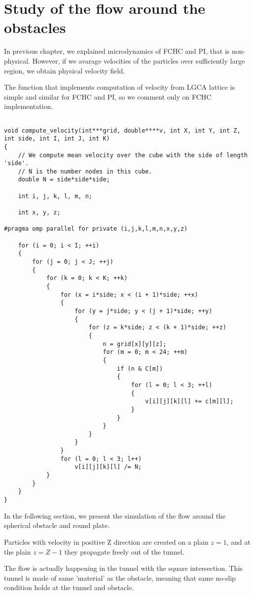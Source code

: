\chapter{Study of the flow around the obstacles}

In previous chapter, we explained microdynamics of FCHC and PI, that is non-physical.
However, if we avarage velocities of the particles over sufficiently large region, we obtain physical velocity field.

The function that implements computation of velocity from LGCA lattice is simple and similar for FCHC and PI, so we comment only on FCHC implementation.

\begin{lstlisting}

void compute_velocity(int***grid, double****v, int X, int Y, int Z, int side, int I, int J, int K)
{
	// We compute mean velocity over the cube with the side of length 'side'.
	// N is the number nodes in this cube.
	double N = side*side*side;

	int i, j, k, l, m, n;

	int x, y, z;

#pragma omp parallel for private (i,j,k,l,m,n,x,y,z)

	for (i = 0; i < I; ++i)
	{
		for (j = 0; j < J; ++j)
		{
			for (k = 0; k < K; ++k)
			{
				for (x = i*side; x < (i + 1)*side; ++x)
				{
					for (y = j*side; y < (j + 1)*side; ++y)
					{
						for (z = k*side; z < (k + 1)*side; ++z)
						{
							n = grid[x][y][z];
							for (m = 0; m < 24; ++m)
							{
								if (n & C[m])
								{
									for (l = 0; l < 3; ++l)
									{
										v[i][j][k][l] += c[m][l];
									}
								}
							}
						}
					}
				}
				for (l = 0; l < 3; l++)
					v[i][j][k][l] /= N;
			}
		}
	}
}
\end{lstlisting}

In the following section, we present the simulation of the flow around the spherical obstacle and round plate.

\bigskip

Particles with velocity in positive Z direction are created on a plain $z=1$, and at the plain $z = Z - 1$ they propagate freely out of the tunnel. 

The flow is actually happening in the tunnel with the square intersection. This tunnel is made of same 'material' as the obstacle, meaning that same no-slip condition holds at the tunnel and obstacle.


